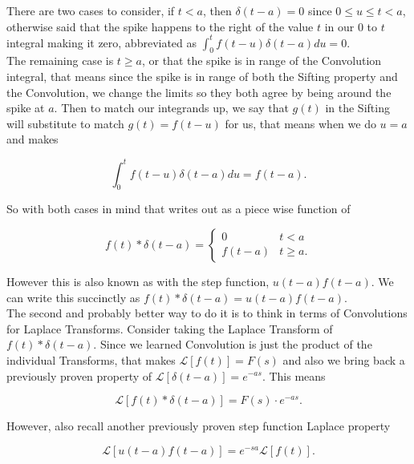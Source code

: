 \documentclass[12pt]{article}
\newcommand{\lp}{\mathscr{L}}
\begin{document}
There are two cases to consider, if $t<a$, then $\delta(t-a)=0$ since $0\leq u\leq t<a$, otherwise said that the spike happens to the right of the value $t$ in our $0$ to $t$ integral making it zero, abbreviated as $\int_{0}^{t} f(t-u)\delta(t-a) du=0$. \\

The remaining case is $t\geq a$, or that the spike is in range of the Convolution integral, that means since the spike is in range of both the Sifting property and the Convolution, we change the limits so they both agree by being around the spike at $a$. Then to match our integrands up, we say that $g(t)$ in the Sifting will substitute to match $g(t)=f(t-u)$ for us, that means when we do $u=a$ and makes

\begin{equation*}
     \int_{0}^{t} f(t-u)\delta(t-a) du = f(t-a).
\end{equation*}

So with both cases in mind that writes out as a piece wise function of

\begin{equation*}
    f(t) \ast \delta(t-a) = \left\{
        \begin{array}{cc}
            0 &  t<a  \\
            f(t-a) &  t\geq a.
        \end{array}
    \right.
\end{equation*}

However this is also known as with the step function, $u(t-a)f(t-a)$. We can write this succinctly as $f(t) \ast \delta(t-a)=u(t-a)f(t-a)$. \\

The second and probably better way to do it is to think in terms of Convolutions for Laplace Transforms. Consider taking the Laplace Transform of $f(t) \ast \delta(t-a)$. Since we learned Convolution is just the product of the individual Transforms, that makes $\lp[f(t)]=F(s)$ and also we bring back a previously proven property of $\lp[\delta(t-a)]=e^{-as}$. This means

\begin{equation*}
    \lp[f(t) \ast \delta(t-a)] = F(s)\cdot e^{-as}. 
\end{equation*}

However, also recall another previously proven step function Laplace property

\begin{equation*}
    \lp[u(t-a)f(t-a)]=e^{-sa}\lp[f(t)].
\end{equation*}
\end{document}
